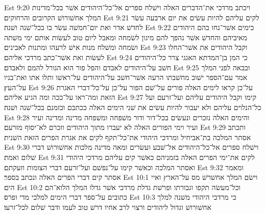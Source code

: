 Est 9:20  ויכתב מרדכי את־הדברים האלה וישׁלח ספרים אל־כל־היהודים אשׁר בכל־מדינות המלך אחשׁורושׁ הקרובים והרחוקים׃
Est 9:21  לקים עליהם להיות עשׂים את יום ארבעה עשׂר לחדשׁ אדר ואת יום־חמשׁה עשׂר בו בכל־שׁנה ושׁנה׃
Est 9:22  כימים אשׁר־נחו בהם היהודים מאיביהם והחדשׁ אשׁר נהפך להם מיגון לשׂמחה ומאבל ליום טוב לעשׂות אותם ימי משׁתה ושׂמחה ומשׁלח מנות אישׁ לרעהו ומתנות לאבינים׃
Est 9:23  וקבל היהודים את אשׁר־החלו לעשׂות ואת אשׁר־כתב מרדכי אליהם׃
Est 9:24  כי המן בן־המדתא האגגי צרר כל־היהודים חשׁב על־היהודים לאבדם והפל פור הוא הגורל להמם ולאבדם׃
Est 9:25  ובבאה לפני המלך אמר עם־הספר ישׁוב מחשׁבתו הרעה אשׁר־חשׁב על־היהודים על־ראשׁו ותלו אתו ואת־בניו על־העץ׃
Est 9:26  על־כן קראו לימים האלה פורים על־שׁם הפור על־כן על־כל־דברי האגרת הזאת ומה־ראו על־ככה ומה הגיע אליהם׃
Est 9:27  קימו וקבל היהודים עליהם ועל־זרעם ועל כל־הנלוים עליהם ולא יעבור להיות עשׂים את שׁני הימים האלה ככתבם וכזמנם בכל־שׁנה ושׁנה׃
Est 9:28  והימים האלה נזכרים ונעשׂים בכל־דור ודור משׁפחה ומשׁפחה מדינה ומדינה ועיר ועיר וימי הפורים האלה לא יעברו מתוך היהודים וזכרם לא־יסוף מזרעם׃
Est 9:29  ותכתב אסתר המלכה בת־אביחיל ומרדכי היהודי את־כל־תקף לקים את אגרת הפרים הזאת השׁנית׃
Est 9:30  וישׁלח ספרים אל־כל־היהודים אל־שׁבע ועשׂרים ומאה מדינה מלכות אחשׁורושׁ דברי שׁלום ואמת׃
Est 9:31  לקים את־ימי הפרים האלה בזמניהם כאשׁר קים עליהם מרדכי היהודי ואסתר המלכה וכאשׁר קימו על־נפשׁם ועל־זרעם דברי הצומות וזעקתם׃
Est 9:32  ומאמר אסתר קים דברי הפרים האלה ונכתב בספר׃
Est 10:1  וישׂם המלך אחשׁרשׁ מס על־הארץ ואיי הים׃
Est 10:2  וכל־מעשׂה תקפו וגבורתו ופרשׁת גדלת מרדכי אשׁר גדלו המלך הלוא־הם כתובים על־ספר דברי הימים למלכי מדי ופרס׃
Est 10:3  כי מרדכי היהודי משׁנה למלך אחשׁורושׁ וגדול ליהודים ורצוי לרב אחיו דרשׁ טוב לעמו ודבר שׁלום לכל־זרעו׃


